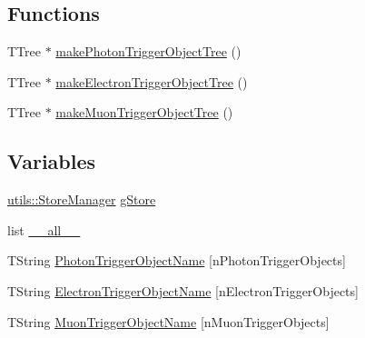 \subsection*{Functions}
\begin{DoxyCompactItemize}
\item 
TTree $\ast$ \hyperlink{namespacepanda_ac00a6d91076afaad98db1f2cf8e27b53}{makePhotonTriggerObjectTree} ()
\item 
TTree $\ast$ \hyperlink{namespacepanda_a364615e31f3eb9ebbf653623a50c3c21}{makeElectronTriggerObjectTree} ()
\item 
TTree $\ast$ \hyperlink{namespacepanda_a683a6f452183115c3480de39e72d17d9}{makeMuonTriggerObjectTree} ()
\end{DoxyCompactItemize}
\subsection*{Variables}
\begin{DoxyCompactItemize}
\item 
\hyperlink{classpanda_1_1utils_1_1StoreManager}{utils::StoreManager} \hyperlink{namespacepanda_a9502e581e4143e9eb5b26249625f8fe4}{gStore}
\item 
list \hyperlink{namespacepanda_a07bcd2dd27ad63919a99b0f40d4a3883}{\_\-\_\-all\_\-\_\-}
\item 
TString \hyperlink{namespacepanda_a323f460e44dbf9eba1f06cfc4186dc99}{PhotonTriggerObjectName} \mbox{[}nPhotonTriggerObjects\mbox{]}
\item 
TString \hyperlink{namespacepanda_a02d6deff9694c424ea17b18841c10c99}{ElectronTriggerObjectName} \mbox{[}nElectronTriggerObjects\mbox{]}
\item 
TString \hyperlink{namespacepanda_ab0aef64e5845b73e1072a7ed38cfd5c2}{MuonTriggerObjectName} \mbox{[}nMuonTriggerObjects\mbox{]}
\end{DoxyCompactItemize}


